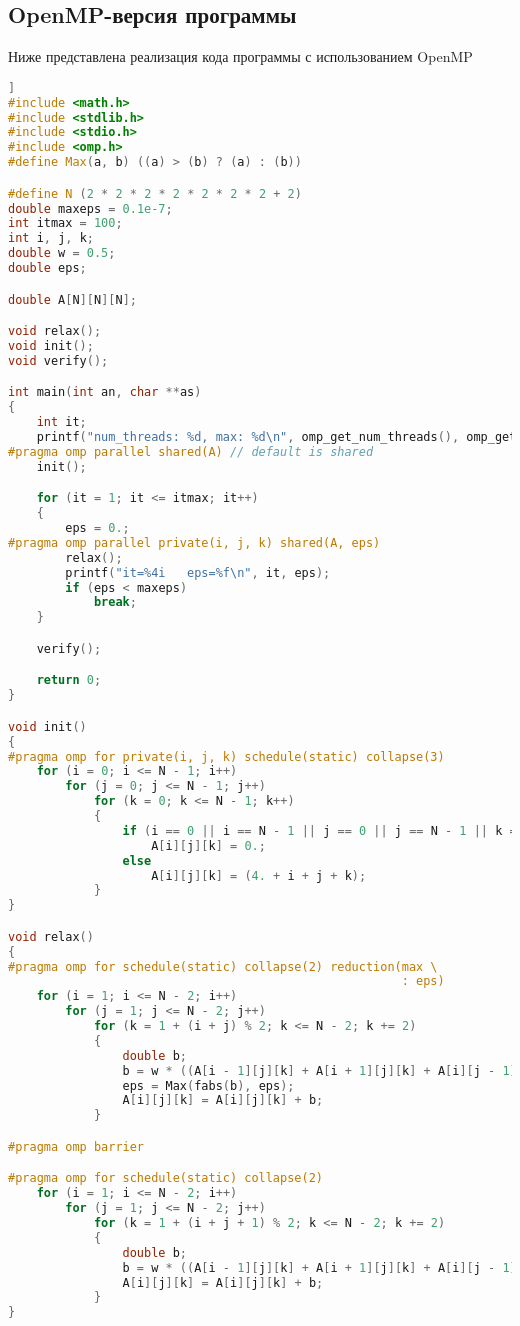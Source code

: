 \subsection{OpenMP-версия программы}
Ниже представлена реализация кода программы с использованием OpenMP
\begin{lstlisting}[language=c++]]
#include <math.h>
#include <stdlib.h>
#include <stdio.h>
#include <omp.h>
#define Max(a, b) ((a) > (b) ? (a) : (b))

#define N (2 * 2 * 2 * 2 * 2 * 2 * 2 + 2)
double maxeps = 0.1e-7;
int itmax = 100;
int i, j, k;
double w = 0.5;
double eps;

double A[N][N][N];

void relax();
void init();
void verify();

int main(int an, char **as)
{
    int it;
    printf("num_threads: %d, max: %d\n", omp_get_num_threads(), omp_get_max_threads());
#pragma omp parallel shared(A) // default is shared
    init();

    for (it = 1; it <= itmax; it++)
    {
        eps = 0.;
#pragma omp parallel private(i, j, k) shared(A, eps)
        relax();
        printf("it=%4i   eps=%f\n", it, eps);
        if (eps < maxeps)
            break;
    }

    verify();

    return 0;
}

void init()
{
#pragma omp for private(i, j, k) schedule(static) collapse(3)
    for (i = 0; i <= N - 1; i++)
        for (j = 0; j <= N - 1; j++)
            for (k = 0; k <= N - 1; k++)
            {
                if (i == 0 || i == N - 1 || j == 0 || j == N - 1 || k == 0 || k == N - 1)
                    A[i][j][k] = 0.;
                else
                    A[i][j][k] = (4. + i + j + k);
            }
}

void relax()
{
#pragma omp for schedule(static) collapse(2) reduction(max \
                                                       : eps)
    for (i = 1; i <= N - 2; i++)
        for (j = 1; j <= N - 2; j++)
            for (k = 1 + (i + j) % 2; k <= N - 2; k += 2)
            {
                double b;
                b = w * ((A[i - 1][j][k] + A[i + 1][j][k] + A[i][j - 1][k] + A[i][j + 1][k] + A[i][j][k - 1] + A[i][j][k + 1]) / 6. - A[i][j][k]);
                eps = Max(fabs(b), eps);
                A[i][j][k] = A[i][j][k] + b;
            }

#pragma omp barrier

#pragma omp for schedule(static) collapse(2)
    for (i = 1; i <= N - 2; i++)
        for (j = 1; j <= N - 2; j++)
            for (k = 1 + (i + j + 1) % 2; k <= N - 2; k += 2)
            {
                double b;
                b = w * ((A[i - 1][j][k] + A[i + 1][j][k] + A[i][j - 1][k] + A[i][j + 1][k] + A[i][j][k - 1] + A[i][j][k + 1]) / 6. - A[i][j][k]);
                A[i][j][k] = A[i][j][k] + b;
            }
}


\end{lstlisting}
